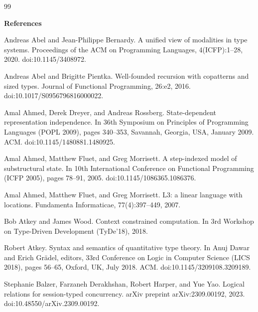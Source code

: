 \documentclass[10pt,a4paper]{amsart}
\begin{document}
\begin{thebibliography}{99}

 
\par\medskip\noindent\textbf{References}\par
  
\par\noindent  [1]  Andreas Abel and Jean-Philippe Bernardy.  A unified view of modalities in type systems.  Proceedings of the ACM on Programming Languages, 4(ICFP):1–28, 2020.  doi:10.1145/3408972.  
 
\par\noindent  [2]  Andreas Abel and Brigitte Pientka.  Well-founded recursion with copatterns and sized types.  Journal of Functional Programming, 26:e2, 2016.  doi:10.1017/S0956796816000022.  
 
\par\noindent  [3]  Amal Ahmed, Derek Dreyer, and Andreas Rossberg.  State-dependent representation independence.  In 36th Symposium on Principles of Programming Languages (POPL 2009), pages 340–353, Savannah, Georgia, USA, January 2009. ACM.  doi:10.1145/1480881.1480925.  
 
\par\noindent  [4]  Amal Ahmed, Matthew Fluet, and Greg Morrisett.  A step-indexed model of substructural state.  In 10th International Conference on Functional Programming (ICFP 2005), pages 78–91, 2005.  doi:10.1145/1086365.1086376.  
 
\par\noindent  [5]  Amal Ahmed, Matthew Fluet, and Greg Morrisett.  L3: a linear language with locations.  Fundamenta Informaticae, 77(4):397–449, 2007.  
 
\par\noindent  [6]  Bob Atkey and James Wood.  Context constrained computation.  In 3rd Workshop on Type-Driven Development (TyDe’18), 2018.  
 
\par\noindent  [7]  Robert Atkey.  Syntax and semantics of quantitative type theory.  In Anuj Dawar and Erich Grädel, editors, 33rd Conference on Logic in Computer Science (LICS 2018), pages 56–65, Oxford, UK, July 2018. ACM.  doi:10.1145/3209108.3209189.  
 
\par\noindent  [8]  Stephanie Balzer, Farzaneh Derakhshan, Robert Harper, and Yue Yao.  Logical relations for session-typed concurrency.  arXiv preprint arXiv:2309.00192, 2023.  doi:10.48550/arXiv.2309.00192.  
 

\end{thebibliography}
\end{document}
